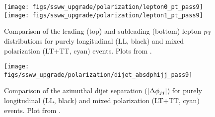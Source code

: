 \begin{figure}[htp]
  \centering
  \texttt{[image: figs/ssww\_upgrade/polarization/lepton0\_pt\_pass9]}\\
  \texttt{[image: figs/ssww\_upgrade/polarization/lepton1\_pt\_pass9]}
  \caption{Comparison of the leading (top) and subleading (bottom) lepton $p_{\mathrm{T}}$ distributions for purely longitudinal (LL, black) and mixed polarization (LT+TT, cyan) \ssww events.  Plots from \cite{2018.ssww-upgrade-support}.}
  \label{fig:polarization_leppt}
\end{figure}

\begin{figure}[htp]
  \centering
  \texttt{[image: figs/ssww\_upgrade/polarization/dijet\_absdphijj\_pass9]}
  \caption{Comparison of the azimuthal dijet separation ($|\Delta\phi_{jj}|$) for purely longitudinal (LL, black) and mixed polarization (LT+TT, cyan) \ssww events.  Plot from \cite{2018.ssww-upgrade-support}.}
  \label{fig:polarization_dphijj}
\end{figure}
